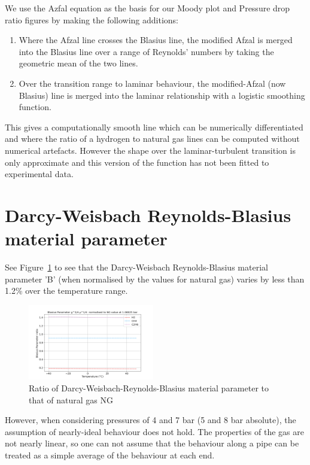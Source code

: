 \documentclass[5p]{elsarticle} %
\begin{document}
We use the Azfal equation as the basis for our Moody plot and Pressure drop ratio figures by making the following additions:

\begin{enumerate}
    \item Where the Afzal line crosses the Blasius line, the modified Afzal is merged into the Blasius line over a range of Reynolds' numbers by taking the geometric mean of the two lines.
    \item Over the transition range to laminar behaviour, the modified-Afzal (now Blasius) line is merged into the laminar relationship with a logistic smoothing function.
\end{enumerate}

This gives a computationally smooth line which can be numerically differentiated and where the ratio of a hydrogen to natural gas lines can be computed without numerical artefacts. However the shape over the laminar-turbulent transition is only approximate and this version of the function has not been fitted to experimental data.

\section{Darcy-Weisbach Reynolds-Blasius material parameter}
\label{blasius2}
See Figure~\ref{fig:blasiusparam} to see that the Darcy-Weisbach Reynolds-Blasius material parameter 'B' (when normalised by the values for natural gas) varies by less than 1.2\% over the temperature range.
\begin{figure}[ht]
\centering
\includegraphics[width=0.49\textwidth]{peng_bf_NG.png}
\caption{Ratio of Darcy-Weisbach-Reynolds-Blasius material parameter  to that of natural gas NG }
\label{fig:blasiusparam}
\end{figure}
However, when considering pressures of 4 and 7 bar (5 and 8 bar absolute), the assumption of nearly-ideal behaviour does not hold. The properties of the gas are not nearly linear, so one can not assume that the behaviour along a pipe can be treated as a simple average of the behaviour at each end.
\end{document}
